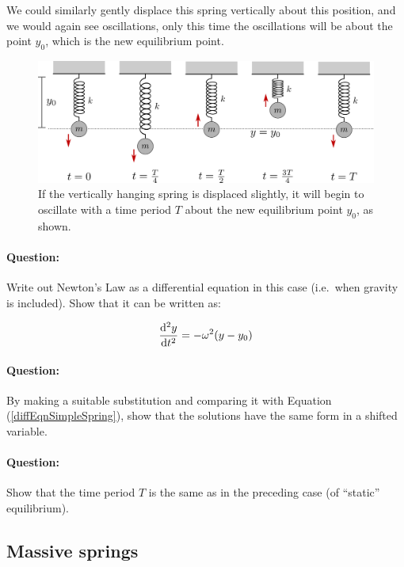 \begin{refsection}
We could similarly gently displace this spring vertically about this position, and we would again see oscillations, only this time the oscillations will be about the point $y_0$, which is the new equilibrium point.

\begin{figure}[!htb]
    \centering
    \includegraphics[width=\textwidth]{figs/springOscillations.png}
    \caption{If the vertically hanging spring is displaced slightly, it will begin to oscillate with a time period $T$ about the new equilibrium point $y_0$, as shown.}
    \label{fig:springOscillations}
\end{figure}


\begin{question}
\paragraph{Question:} Write out Newton's Law as a differential equation in this case (i.e.\ when gravity is included). Show that it can be written as:

\begin{equation*}
    \dv[2]{y}{t} = -\omega^2 (y - y_0) 
\end{equation*}

\paragraph{Question:} By making a suitable substitution and comparing it with Equation (\ref{diffEqnSimpleSpring}), show that the solutions have the same form in a shifted variable.

\paragraph{Question:} Show that the time period $T$ is the same as in the preceding case (of ``static'' equilibrium).
\end{question}


\subsection*{Massive springs}


\end{refsection}
